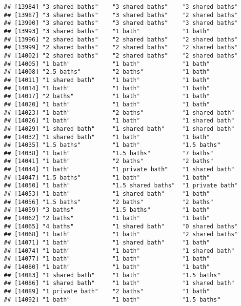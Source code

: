\documentclass[
]{article}
\begin{document}
\begin{verbatim}
## [13984] "3 shared baths"    "3 shared baths"    "3 shared baths"   
## [13987] "3 shared baths"    "3 shared baths"    "2 shared baths"   
## [13990] "3 shared baths"    "3 shared baths"    "3 shared baths"   
## [13993] "3 shared baths"    "1 bath"            "1 bath"           
## [13996] "2 shared baths"    "2 shared baths"    "2 shared baths"   
## [13999] "2 shared baths"    "2 shared baths"    "2 shared baths"   
## [14002] "2 shared baths"    "2 shared baths"    "2 shared baths"   
## [14005] "1 bath"            "1 bath"            "1 bath"           
## [14008] "2.5 baths"         "2 baths"           "1 bath"           
## [14011] "1 shared bath"     "1 bath"            "1 bath"           
## [14014] "1 bath"            "1 bath"            "1 bath"           
## [14017] "2 baths"           "1 bath"            "1 bath"           
## [14020] "1 bath"            "1 bath"            "1 bath"           
## [14023] "1 bath"            "2 baths"           "1 shared bath"    
## [14026] "1 bath"            "1 bath"            "1 shared bath"    
## [14029] "1 shared bath"     "1 shared bath"     "1 shared bath"    
## [14032] "1 shared bath"     "1 bath"            "1 bath"           
## [14035] "1.5 baths"         "1 bath"            "1.5 baths"        
## [14038] "1 bath"            "1.5 baths"         "7 baths"          
## [14041] "1 bath"            "2 baths"           "2 baths"          
## [14044] "1 bath"            "1 private bath"    "1 shared bath"    
## [14047] "1.5 baths"         "1 bath"            "1 bath"           
## [14050] "1 bath"            "1.5 shared baths"  "1 private bath"   
## [14053] "1 bath"            "1 shared bath"     "1 bath"           
## [14056] "1.5 baths"         "2 baths"           "2 baths"          
## [14059] "3 baths"           "1.5 baths"         "1 bath"           
## [14062] "2 baths"           "1 bath"            "1 bath"           
## [14065] "4 baths"           "1 shared bath"     "0 shared baths"   
## [14068] "1 bath"            "1 bath"            "2 shared baths"   
## [14071] "1 bath"            "1 shared bath"     "1 bath"           
## [14074] "1 bath"            "1 bath"            "1 shared bath"    
## [14077] "1 bath"            "1 bath"            "1 bath"           
## [14080] "1 bath"            "1 bath"            "1 bath"           
## [14083] "1 shared bath"     "1 bath"            "1.5 baths"        
## [14086] "1 shared bath"     "1 bath"            "1 shared bath"    
## [14089] "1 private bath"    "2 baths"           "1 bath"           
## [14092] "1 bath"            "1 bath"            "1.5 baths"        

\end{verbatim}
\end{document}
